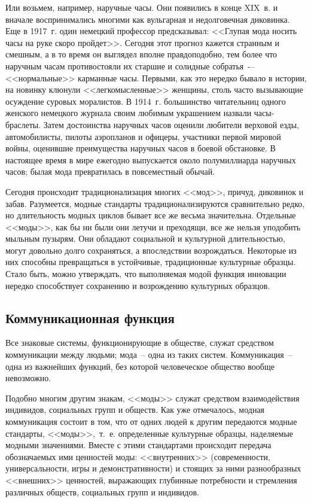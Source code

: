   Или возьмем, например, наручные часы. Они появились в конце XIX~в. и вначале
  воспринимались многими как вульгарная и недолговечная диковинка. Еще в 1917~г.
  один немецкий профессор предсказывал: <<Глупая мода носить часы на руке скоро
  пройдет>>. Сегодня этот прогноз кажется странным и смешным, а в то время он
  выглядел вполне правдоподобно, тем более что наручным часам противостояли их
  старшие и солидные собратья~-– <<нормальные>> карманные часы. Первыми, как это
  нередко бывало в истории, на новинку клюнули <<легкомысленные>> женщины, столь
  часто вызывающие осуждение суровых моралистов. В 1914~г. большинство
  читательниц одного женского немецкого журнала своим любимым украшением назвали
  часы-браслеты. Затем достоинства наручных часов оценили любители верховой
  езды, автомобилисты, пилоты аэропланов и офицеры, участники первой мировой
  войны, оценившие преимущества наручных часов в боевой обстановке. В настоящее
  время в мире ежегодно выпускается около полумиллиарда наручных часов; былая
  мода превратилась в повсеместный обычай.
  
  Сегодня происходит традиционализация многих <<мод>>, причуд, диковинок и
  забав. Разумеется, модные стандарты традиционализируются сравнительно редко,
  но длительность модных циклов бывает все же весьма значительна. Отдельные
  <<моды>>, как бы ни были они летучи и преходящи, все же нельзя уподобить
  мыльным пузырям. Они обладают социальной и культурной длительностью, могут
  довольно долго сохраняться, а впоследствии возрождаться. Некоторые из них
  способны превращаться в устойчивые, традиционные культурные образцы. Стало
  быть, можно утверждать, что выполняемая модой функция инновации нередко
  способствует сохранению и возрождению культурных образцов.
  
  \subsection{Коммуникационная функция}  
  
  Все знаковые системы, функционирующие в обществе, служат средством
  коммуникации между людьми; мода~-- одна из таких систем. Коммуникация~-- одна
  из важнейших функций, без которой человеческое общество вообще невозможно.
  
  Подобно многим другим знакам, <<моды>> служат средством взаимодействия
  индивидов, социальных групп и обществ. Как уже отмечалось, модная коммуникация
  состоит в том, что от одних людей к другим передаются модные стандарты,
  <<моды>>,~т.~е. определенные культурные образцы, наделяемые модными
  значениями. Вместе с этими стандартами происходит передача обозначаемых ими
  ценностей моды: <<внутренних>> (современности, универсальности, игры и
  демонстративности) и стоящих за ними разнообразных <<внешних>> ценностей,
  выражающих глубинные потребности и стремления различных обществ, социальных
  групп и индивидов.
  
